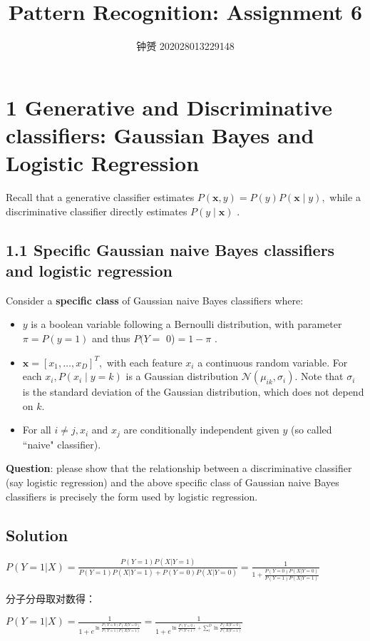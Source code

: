 \documentclass[UTF8]{ctexart}
\title{Pattern Recognition: Assignment 6}
\author{钟赟 202028013229148}
\begin{document}
\maketitle
\setlength{\parindent}{0pt}
\section*{1  Generative and Discriminative classifiers: Gaussian Bayes and Logistic Regression}
Recall that a generative classifier estimates $P(\mathbf{x}, y)=P(y) P(\mathbf{x} \mid y),$ while a discriminative classifier directly estimates $P(y \mid \mathbf{x})$ .
\subsection*{1.1 Specific Gaussian naive Bayes classifiers and logistic regression}
Consider a \textbf{specific class} of Gaussian naive Bayes classifiers where:

\begin{itemize}
	\item $y$ is a boolean variable following a Bernoulli distribution, with parameter $\pi=P(y=1)$ and thus $P(Y=$
	0)$=1-\pi$ .
	\item $\mathbf{x}=\left[x_{1}, \ldots, x_{D}\right]^{T},$ with each feature $x_{i}$ a continuous random variable. For each $x_{i}, P\left(x_{i} \mid y=k\right)$ is a
Gaussian distribution $\mathcal{N}\left(\mu_{i k}, \sigma_{i}\right) .$ Note that $\sigma_{i}$ is the standard deviation of the Gaussian distribution, which
does not depend on $k$.
	\item For all $i \neq j, x_{i}$ and $x_{j}$ are conditionally independent given $y$ (so called ``naive" classifier).
\end{itemize}

\textbf{Question}:  please show that the relationship between a discriminative classifier (say logistic regression) and the
above specific class of Gaussian naive Bayes classifiers is precisely the form used by logistic regression.
\subsection*{Solution}
$P(Y=1|X)=\frac{P(Y=1)P(X|Y=1)}{P(Y=1)P(X|Y=1)+P(Y=0)P(X|Y=0)} = \frac{1}{1+\frac{P(Y=0)P(X|Y=0)}{P(Y=1)P(X|Y=1)}}$

分子分母取对数得：

$P(Y=1|X)=\frac{1}{1+e^{\ln\frac{P(Y=0)P(X|Y=0)}{P(Y=1)P(X|Y=1)}}} = \frac{1}{1+e^{\ln\frac{P(Y=0)}{P(Y+1)}+\sum_i^D \ln\frac{P(X|Y=0)}{P(X|Y=1)}}}$
\end{document}
